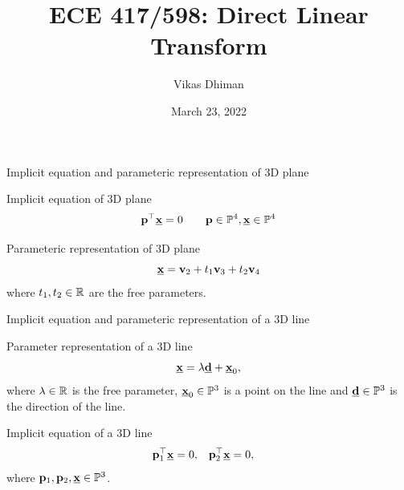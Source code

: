 \documentclass[times,t]{beamer}
\title{ECE 417/598: Direct Linear Transform }
\author{Vikas Dhiman}
\date{March 23, 2022}
\begin{document}
\newcommand{\ubfu}{\underline{\bfu}}
\newcommand{\ubfx}{\underline{\bfx}}
\begin{frame}
  \titlepage
  \end{frame}


\begin{frame}{Implicit equation and parameteric representation of 3D plane} 

  \begin{minipage}{0.4\linewidth}
    Implicit equation of 3D plane
    \[ 
    \bfp^\top \ubfx = 0 \qquad \bfp \in \bbP^4, \ubfx \in \bbP^4 \]
    \end{minipage}
    \hfill
    \begin{minipage}{0.4\linewidth}
      Parameteric representation of 3D plane
        \[
          \ubfx = \bfv_2 + t_1 \bfv_3 + t_2 \bfv_4
        \]
        where $t_1, t_2 \in \mathbb{R}$ are the free parameters.
    \end{minipage}
\end{frame}

\begin{frame}{Implicit equation and parameteric representation of a 3D line} 
  \begin{minipage}{0.4\linewidth}
    Parameter representation of a 3D line
    \[ 
      \ubfx = \lambda \underline{\bfd} + \ubfx_0,
    \]
    where $\lambda \in \mathbb{R}$ is the free parameter, $\ubfx_0 \in \bbP^3$ is a point on
    the line and $\underline{\mathbf{d}} \in \mathbb{P}^3$ is the direction of the line.
  \end{minipage}
  \hfill
  \begin{minipage}{0.4\linewidth}
    Implicit equation of a 3D line
    \begin{align}
      \bfp_1^\top  \ubfx &= 0, & \bfp_2^\top \ubfx &= 0,
    \end{align}
    where $\bfp_1, \bfp_2, \ubfx \in \bbP^3$.
  \end{minipage}
\end{frame}
\end{document}
